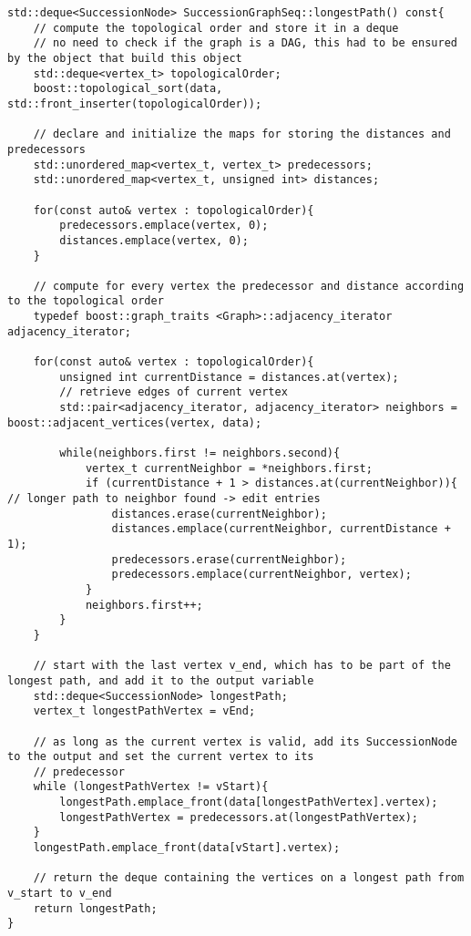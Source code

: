 \begin{verbatim}
std::deque<SuccessionNode> SuccessionGraphSeq::longestPath() const{
	// compute the topological order and store it in a deque
	// no need to check if the graph is a DAG, this had to be ensured by the object that build this object
	std::deque<vertex_t> topologicalOrder;
	boost::topological_sort(data, std::front_inserter(topologicalOrder));

	// declare and initialize the maps for storing the distances and predecessors
	std::unordered_map<vertex_t, vertex_t> predecessors;
	std::unordered_map<vertex_t, unsigned int> distances;

	for(const auto& vertex : topologicalOrder){
		predecessors.emplace(vertex, 0);
		distances.emplace(vertex, 0);
	}

	// compute for every vertex the predecessor and distance according to the topological order
	typedef boost::graph_traits <Graph>::adjacency_iterator adjacency_iterator;
	
	for(const auto& vertex : topologicalOrder){
		unsigned int currentDistance = distances.at(vertex);
		// retrieve edges of current vertex
		std::pair<adjacency_iterator, adjacency_iterator> neighbors = boost::adjacent_vertices(vertex, data);
	
		while(neighbors.first != neighbors.second){
			vertex_t currentNeighbor = *neighbors.first;
			if (currentDistance + 1 > distances.at(currentNeighbor)){ // longer path to neighbor found -> edit entries
				distances.erase(currentNeighbor);
				distances.emplace(currentNeighbor, currentDistance + 1);
				predecessors.erase(currentNeighbor);
				predecessors.emplace(currentNeighbor, vertex);
			}
			neighbors.first++;
		}
	}
	
	// start with the last vertex v_end, which has to be part of the longest path, and add it to the output variable
	std::deque<SuccessionNode> longestPath;
	vertex_t longestPathVertex = vEnd;
	
	// as long as the current vertex is valid, add its SuccessionNode to the output and set the current vertex to its
	// predecessor
	while (longestPathVertex != vStart){
		longestPath.emplace_front(data[longestPathVertex].vertex);
		longestPathVertex = predecessors.at(longestPathVertex);
	}
	longestPath.emplace_front(data[vStart].vertex);
	
	// return the deque containing the vertices on a longest path from v_start to v_end
	return longestPath;
}
\end{verbatim}

